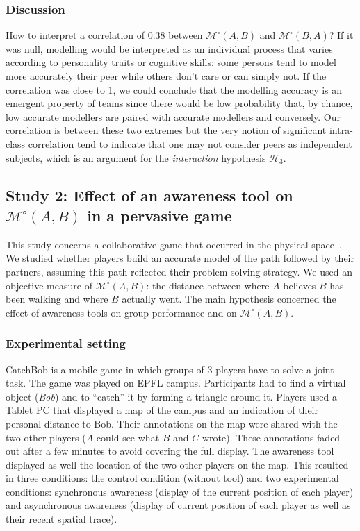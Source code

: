 \documentclass[natbib]{svjour3}
\newcommand{\gModel}[2]{{$\mathcal{M}^{\circ}(#1, #2)$}}
\begin{document}
\subsubsection*{Discussion}

How to interpret a correlation of 0.38 between \gModel{A}{B} and \gModel{B}{A}?
If it was null, modelling would be interpreted as an individual process that
varies according to personality traits or cognitive skills: some persons tend to
model more accurately their peer while others don't care or can simply not. If
the correlation was close to 1, we could conclude that the modelling accuracy is
an emergent property of teams since there would be low probability that, by
chance, low accurate modellers are paired with accurate modellers and
conversely. Our correlation is between these two extremes but the very notion of
significant intra-class correlation tend to indicate that one may not consider
peers as independent subjects, which is an argument for the \emph{interaction}
hypothesis $\mathcal{H}_{3}$. 


\subsection{{\bf Study 2}: Effect of an awareness tool on \gModel{A}{B}  in a pervasive
game}

This study concerns a collaborative game that occurred in the physical
space~\citep{nova2006underwhelming}. We studied whether players build an accurate
model of the path followed by their partners, assuming this path reflected their
problem solving strategy. We used an objective measure of \gModel{A}{B}: the
distance between where $A$ believes $B$ has been walking and where $B$ actually went.
The main hypothesis concerned the effect of awareness tools on group performance
and on \gModel{A}{B}. 

\subsubsection*{Experimental setting}

{\sc CatchBob} is a mobile game in which groups of 3 players have to solve a
joint task. The game was played on EPFL campus. Participants had to find a
virtual object (\emph{Bob}) and to ``catch'' it by forming a triangle around it.
Players used a Tablet PC that displayed a map of the campus and an indication of
their personal distance to Bob. Their annotations on the map were shared with
the two other players ($A$ could see what $B$ and $C$ wrote). These annotations
faded out after a few minutes to avoid covering the full display. The awareness
tool displayed as well the location of the two other players on the map. This
resulted in three conditions: the control condition (without tool) and two
experimental conditions: synchronous awareness (display of the current position
of each player) and asynchronous awareness (display of current position of each
player as well as their recent spatial trace).
\end{document}
